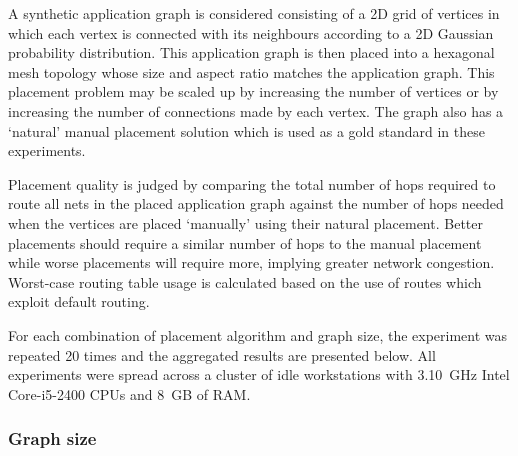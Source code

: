			A synthetic application graph is considered consisting of a 2D grid of
			vertices in which each vertex is connected with its neighbours according
			to a 2D Gaussian probability distribution. This application graph is then
			placed into a hexagonal mesh topology whose size and aspect ratio matches
			the application graph. This placement problem may be scaled up by
			increasing the number of vertices or by increasing the number of
			connections made by each vertex. The graph also has a `natural' manual
			placement solution which is used as a gold standard in these experiments.
			
			Placement quality is judged by comparing the total number of hops
			required to route all nets in the placed application graph against the
			number of hops needed when the vertices are placed `manually' using their
			natural placement. Better placements should require a similar number of
			hops to the manual placement while worse placements will require more,
			implying greater network congestion. Worst-case routing table usage is
			calculated based on the use of routes which exploit default routing.
			
			For each combination of placement algorithm and graph size, the
			experiment was repeated 20 times and the aggregated results are presented
			below. All experiments were spread across a cluster of idle workstations
			with 3.10~GHz Intel Core-i5-2400 CPUs and 8~GB of RAM.
			
			\subsubsection{Graph size}
				
